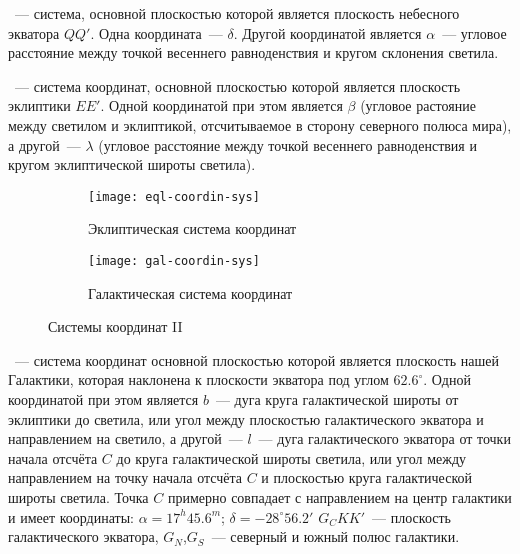 ~--- система, основной плоскостью которой является плоскость небесного экватора $QQ'$. Одна координата~---  $\delta$. Другой координатой является  $\alpha$~--- угловое расстояние между точкой весеннего равноденствия и кругом склонения светила.

~--- система координат, основной плоскостью которой является плоскость эклиптики $EE'$. Одной координатой при этом является  $\beta$ (угловое растояние между светилом и эклиптикой, отсчитываемое в сторону северного полюса мира), а другой~---  $\lambda$ (угловое расстояние между точкой весеннего равноденствия и кругом эклиптической широты светила).

\begin{figure}[!h]
\centering
	\begin{subfigure}{0.49\textwidth}
		\texttt{[image: eql-coordin-sys]}
		\caption{Эклиптическая система координат}
	 \end{subfigure}
	 \hfill
	\begin{subfigure}{0.49\textwidth}
		\texttt{[image: gal-coordin-sys]}
		\caption{Галактическая система координат}
	 \end{subfigure}
	\caption{Системы координат II}
\end{figure}

~--- система координат основной плоскостью которой является плоскость нашей Галактики, которая наклонена к плоскости экватора под углом $62.6^{\circ}$. Одной координатой при этом является  $b$~--- дуга круга галактической широты от эклиптики до светила, или угол между плоскостью галактического экватора и направлением на светило, а другой~---  $l$~--- дуга галактического экватора от точки начала отсчёта $C$ до круга галактической широты светила, или угол между направлением на точку начала отсчёта $C$ и плоскостью круга галактической широты светила. Точка $C$ примерно совпадает с направлением на центр галактики и имеет координаты: $\alpha=17^h45.6^m$; $\delta=-28^{\circ}56.2'$ $G_CKK'$~--- плоскость галактического экватора, $G_N$,$G_S$~--- северный и южный полюс галактики.
